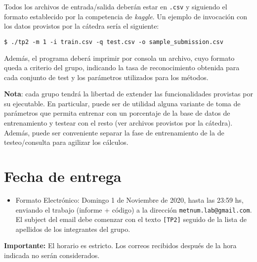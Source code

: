 \documentclass[11pt, a4paper]{article}
\newcommand{\kaggle}{\textit{kaggle}}
\begin{document}
Todos los archivos de entrada/salida deberán estar en \verb|.csv| y siguiendo el formato establecido por la competencia de \kaggle. Un ejemplo de invocación con los datos provistos por la cátedra sería el siguiente:
\begin{verbatim}
$ ./tp2 -m 1 -i train.csv -q test.csv -o sample_submission.csv
\end{verbatim}

Además, el programa deberá imprimir por consola un archivo, cuyo formato queda a criterio del grupo, indicando la tasa de reconocimiento obtenida para cada conjunto de test y los parámetros utilizados para los métodos.

\textbf{Nota}: cada grupo tendrá la libertad de extender las funcionalidades provistas por su ejecutable. 
En particular, puede ser de utilidad alguna variante de toma de parámetros que permita entrenar con un porcentaje de la base de datos de entrenamiento y testear con el resto (ver archivos provistos por la cátedra). Además, puede ser conveniente separar la fase de entrenamiento de la de testeo/consulta para agilizar los cálculos.

\section*{Fecha de entrega} 

\begin{itemize}
 \item Formato Electrónico: Domingo 1 de Noviembre de 2020, hasta las 23:59 hs, enviando el trabajo (informe +
 código) a la dirección \verb+metnum.lab@gmail.com+. El subject del email debe comenzar con el texto \verb+[TP2]+
 seguido de la lista de apellidos  de los integrantes del grupo.
\end{itemize}

\noindent \textbf{Importante:} El horario es estricto. Los correos recibidos después de la hora indicada no serán considerados.  



\end{document}
